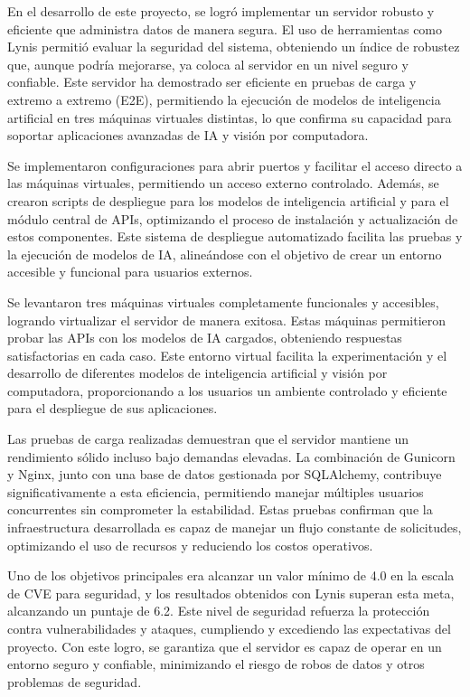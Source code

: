En el desarrollo de este proyecto, se logró implementar un servidor robusto y eficiente que administra datos de manera segura. El uso de herramientas como Lynis permitió evaluar la seguridad del sistema, obteniendo un índice de robustez que, aunque podría mejorarse, ya coloca al servidor en un nivel seguro y confiable. Este servidor ha demostrado ser eficiente en pruebas de carga y extremo a extremo (E2E), permitiendo la ejecución de modelos de inteligencia artificial en tres máquinas virtuales distintas, lo que confirma su capacidad para soportar aplicaciones avanzadas de IA y visión por computadora.

Se implementaron configuraciones para abrir puertos y facilitar el acceso directo a las máquinas virtuales, permitiendo un acceso externo controlado. Además, se crearon scripts de despliegue para los modelos de inteligencia artificial y para el módulo central de APIs, optimizando el proceso de instalación y actualización de estos componentes. Este sistema de despliegue automatizado facilita las pruebas y la ejecución de modelos de IA, alineándose con el objetivo de crear un entorno accesible y funcional para usuarios externos.

Se levantaron tres máquinas virtuales completamente funcionales y accesibles, logrando virtualizar el servidor de manera exitosa. Estas máquinas permitieron probar las APIs con los modelos de IA cargados, obteniendo respuestas satisfactorias en cada caso. Este entorno virtual facilita la experimentación y el desarrollo de diferentes modelos de inteligencia artificial y visión por computadora, proporcionando a los usuarios un ambiente controlado y eficiente para el despliegue de sus aplicaciones.

Las pruebas de carga realizadas demuestran que el servidor mantiene un rendimiento sólido incluso bajo demandas elevadas. La combinación de Gunicorn y Nginx, junto con una base de datos gestionada por SQLAlchemy, contribuye significativamente a esta eficiencia, permitiendo manejar múltiples usuarios concurrentes sin comprometer la estabilidad. Estas pruebas confirman que la infraestructura desarrollada es capaz de manejar un flujo constante de solicitudes, optimizando el uso de recursos y reduciendo los costos operativos.

Uno de los objetivos principales era alcanzar un valor mínimo de 4.0 en la escala de CVE para seguridad, y los resultados obtenidos con Lynis superan esta meta, alcanzando un puntaje de 6.2. Este nivel de seguridad refuerza la protección contra vulnerabilidades y ataques, cumpliendo y excediendo las expectativas del proyecto. Con este logro, se garantiza que el servidor es capaz de operar en un entorno seguro y confiable, minimizando el riesgo de robos de datos y otros problemas de seguridad.
